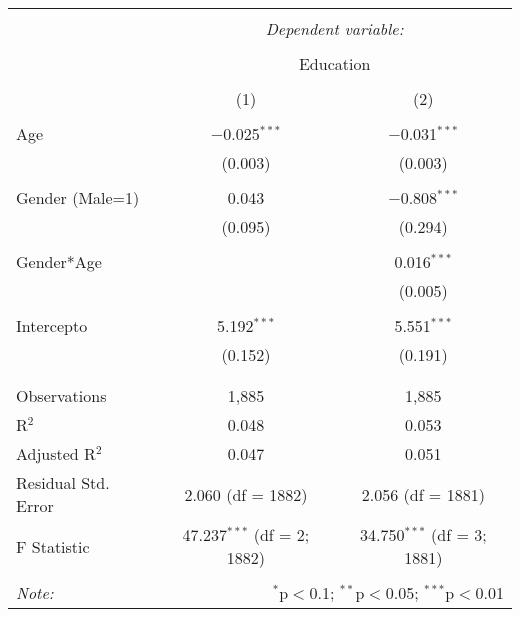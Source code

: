 
\begin{table}[!htbp] \centering 
  \caption{} 
  \label{} 
\begin{tabular}{@{\extracolsep{5pt}}lcc} 
\\[-1.8ex]\hline 
\hline \\[-1.8ex] 
 & \multicolumn{2}{c}{\textit{Dependent variable:}} \\ 
\cline{2-3} 
\\[-1.8ex] & \multicolumn{2}{c}{Education} \\ 
\\[-1.8ex] & (1) & (2)\\ 
\hline \\[-1.8ex] 
 Age & $-$0.025$^{***}$ & $-$0.031$^{***}$ \\ 
  & (0.003) & (0.003) \\ 
  & & \\ 
 Gender (Male=1) & 0.043 & $-$0.808$^{***}$ \\ 
  & (0.095) & (0.294) \\ 
  & & \\ 
 Gender*Age &  & 0.016$^{***}$ \\ 
  &  & (0.005) \\ 
  & & \\ 
 Intercepto & 5.192$^{***}$ & 5.551$^{***}$ \\ 
  & (0.152) & (0.191) \\ 
  & & \\ 
\hline \\[-1.8ex] 
Observations & 1,885 & 1,885 \\ 
R$^{2}$ & 0.048 & 0.053 \\ 
Adjusted R$^{2}$ & 0.047 & 0.051 \\ 
Residual Std. Error & 2.060 (df = 1882) & 2.056 (df = 1881) \\ 
F Statistic & 47.237$^{***}$ (df = 2; 1882) & 34.750$^{***}$ (df = 3; 1881) \\ 
\hline 
\hline \\[-1.8ex] 
\textit{Note:}  & \multicolumn{2}{r}{$^{*}$p$<$0.1; $^{**}$p$<$0.05; $^{***}$p$<$0.01} \\ 
\end{tabular} 
\end{table} 
